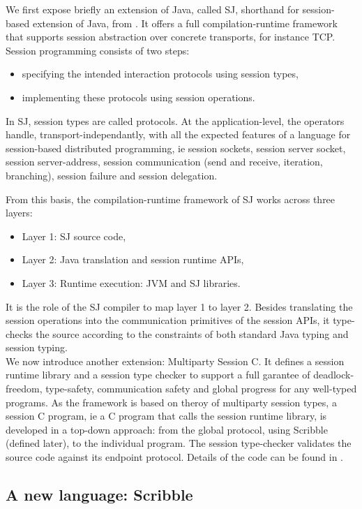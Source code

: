 \documentclass{article}
\begin{document}
We first expose briefly an extension of Java, called SJ, shorthand for session-based extension of Java, from \cite{hu2008session}. It offers a full compilation-runtime framework that supports session abstraction over concrete transports, for instance TCP.\\
Session programming consists of two steps: 
\begin{itemize}
\item specifying the intended interaction protocols using session types, \item implementing these protocols using session operations.
\end{itemize}
In SJ, session types are called protocols. At the application-level, the operators handle, transport-independantly, with all the expected features of a language for session-based distributed programming, ie session sockets, session server socket, session server-address, session communication (send and receive, iteration, branching), session failure and session delegation.

From this basis, the compilation-runtime framework of SJ works across three layers:
\begin{itemize}
\item Layer 1: SJ source code, \item Layer 2: Java translation and session runtime APIs, \item Layer 3: Runtime execution: JVM and SJ libraries.
\end{itemize}
It is the role of the SJ compiler to map layer 1 to layer 2. Besides translating the session operations into the communication primitives of the session APIs, it type-checks the source according to the constraints of both standard Java typing and session typing.
\\

We now introduce another extension: Multiparty Session C. It defines a session runtime library and a session type checker to support a full garantee of deadlock-freedom, type-safety, communication safety and global progress for any well-typed programs. As the framework is based on theroy of multiparty session types, a session C program, ie a C program that calls the session runtime library, is developed in a top-down approach: from the global protocol, using Scribble (defined later), to the individual program. The session type-checker validates the source code against its endpoint protocol. Details of the code can be found in \cite{ngmultiparty}.

\subsection{A new language: Scribble}
\end{document}
